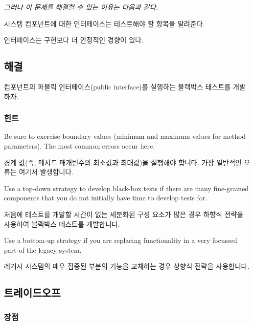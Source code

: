 \documentclass[a4paper,10pt,twoside]{book}
\begin{document}
\emph{그러나 이 문제를 해결할 수 있는 이유는 다음과 같다.}

\begin{bulletlist}
\item 시스템 컴포넌트에 대한 인터페이스는 테스트해야 할 항목을 알려준다.
\item 인터페이스는 구현보다 더 안정적인 경향이 있다.
\end{bulletlist}

\subsection*{해결}

컴포넌트의 퍼블릭 인터페이스(public interface)를 실행하는 블랙박스 테스트를 개발하자.

\subsubsection*{힌트}

\begin{bulletlist}
\item Be sure to exercise boundary values (\ie minimum and maximum values for method parameters). The most common errors occur here.
\item 경계 값(즉, 메서드 매개변수의 최소값과 최대값)을 실행해야 합니다. 가장 일반적인 오류는 여기서 발생합니다.
\item Use a top-down strategy to develop black-box tests if there are many fine-grained components that you do not initially have time to develop tests for.
\item 처음에 테스트를 개발할 시간이 없는 세분화된 구성 요소가 많은 경우 하향식 전략을 사용하여 블랙박스 테스트를 개발합니다.
\item Use a bottom-up strategy if you are replacing functionality in a very focussed part of the legacy system.
\item 레거시 시스템의 매우 집중된 부분의 기능을 교체하는 경우 상향식 전략을 사용합니다.
\end{bulletlist}

\subsection*{트레이드오프}

\subsubsection*{장점}
\end{document}

